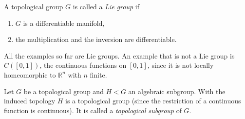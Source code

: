 \begin{definition}
\label{definition-lie-group}
A topological group $G$ is called a
{\it Lie group} if
\begin{enumerate}
\item $G$ is a differentiable manifold,
\item the multiplication and the
inversion are differentiable.
\end{enumerate}
\end{definition}

\begin{remark}
\label{remark-lie-group-examples}
All the examples so far are Lie groups.
An example that is not a Lie group is
$C([0,1])$, the continuous functions on
$[0,1]$, since it is not locally
homeomorphic to $\mathbb{R}^n$ with $n$
finite.
\end{remark}

\begin{definition}
\label{definition-topological-subgroup}
Let $G$ be a topological group and
$H<G$ an algebraic subgroup. With the
induced topology $H$ is a topological
group (since the restriction of a
continuous function is continuous). It
is called a {\it topological subgroup}
of $G$.
\end{definition}

